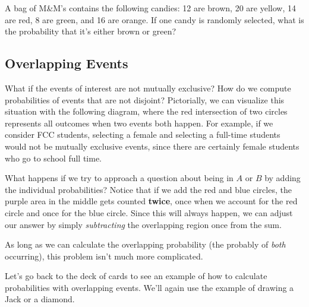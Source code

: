 \begin{try}
A bag of M\&M's contains the following candies:  12 are brown, 20 are yellow, 14 are red, 8 are green, and 16 are orange. If one candy is randomly selected, what is the probability that it's either brown or green? 
\end{try}

\subsection{Overlapping Events}
What if the events of interest are not mutually exclusive? How do we compute probabilities of events that are not disjoint? Pictorially, we can visualize this situation with the following diagram, where the red intersection of two circles represents all outcomes when two events both happen. For example, if we consider FCC students, selecting a female and selecting a full-time students would not be mutually exclusive events, since there are certainly female students who go to school full time.
\begin{center}
\end{center}

What happens if we try to approach a question about being in $A$ or $B$ by adding the individual probabilities?  Notice that if we add the red and blue circles, the purple area in the middle gets counted \textbf{twice}, once when we account for the red circle and once for the blue circle.  Since this will always happen, we can adjust our answer by simply \emph{subtracting} the overlapping region once from the sum.

As long as we can calculate the overlapping probability (the probably of \emph{both} occurring), this problem isn't much more complicated.
\pagebreak

Let's go back to the deck of cards to see an example of how to calculate probabilities with overlapping events.  We'll again use the example of drawing a Jack or a diamond.
\vspace{0.1in}

